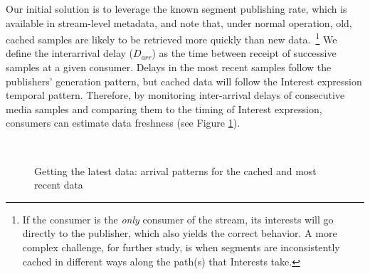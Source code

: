 Our initial solution is to leverage the known segment publishing rate, which is available in stream-level metadata, and note that, under normal operation, old, cached samples are likely to be retrieved more quickly than new data.~\footnote{If the consumer is the \emph{only} consumer of the stream, its interests will go directly to the publisher, which also yields the correct behavior. A more complex challenge, for further study, is when segments are inconsistently cached in different ways along the path(s) that Interests take.} We define the interarrival delay ($D_{arr}$) as the time between receipt of successive samples at a given consumer. Delays in the most recent samples follow the publishers' generation pattern, but cached data will follow the Interest expression temporal pattern. Therefore, by monitoring inter-arrival delays of consecutive media samples and comparing them to the timing of Interest expression, consumers can estimate data freshness (see Figure \ref{fig:inter-arrival}).



\begin{figure}[t!]
\centering

\\

\caption{Getting the latest data: arrival patterns for the cached and most recent data}
\label{fig:inter-arrival}
\end{figure}

